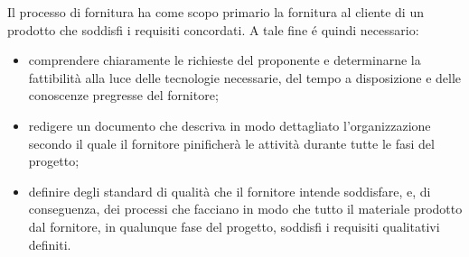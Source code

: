 
Il processo di fornitura ha come scopo primario la fornitura al cliente di un prodotto che soddisfi i 
requisiti concordati. A tale fine \'{e} quindi necessario:

\begin{itemize}
    \item comprendere chiaramente le richieste del proponente e determinarne la fattibilit\`{a} alla luce delle tecnologie necessarie, del tempo a disposizione e delle conoscenze pregresse del fornitore;
    \item redigere un documento che descriva in modo dettagliato l'organizzazione secondo il quale il fornitore pinificher\`{a} le attivit\`{a} durante tutte le fasi del progetto; %
    \item definire degli standard di qualit\`{a} che il fornitore intende soddisfare, e, di conseguenza, dei processi che facciano in modo che tutto il materiale prodotto dal fornitore, in qualunque fase del progetto, soddisfi i requisiti qualitativi definiti.
\end{itemize}